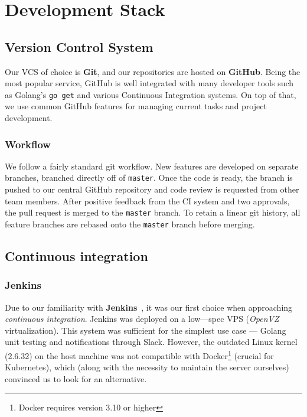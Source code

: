 \chapter{Development Stack}
\section{Version Control System}
Our VCS of choice is \textbf{Git}, and our repositories are hosted on \textbf{GitHub}. Being the most popular service,
GitHub is well integrated with many developer tools such as Golang’s \texttt{go get} and various Continuous Integration systems.
On top of that, we use common GitHub features for managing current tasks and project development.
\subsection{Workflow}
We follow a fairly standard git workflow. New features are developed on separate branches, branched directly off of \texttt{master}.
Once the code is ready, the branch is pushed to our central GitHub repository and code review is requested from other team members.
After positive feedback from the CI system and two approvals, the pull request is merged to the \texttt{master} branch.
To retain a linear git history, all feature branches are rebased onto the \texttt{master} branch before merging.
\section{Continuous integration}
\subsection{Jenkins}
Due to our familiarity with \textbf{Jenkins}~\cite{jenkins}, it was our first choice when approaching \textit{continuous integration}. Jenkins was
deployed on a low---spec VPS (\textit{OpenVZ} virtualization). This system was sufficient for the simplest use case --- Golang unit
testing and notifications through Slack. However, the outdated Linux kernel (2.6.32) on the host machine was not compatible with 
Docker\footnote{Docker requires version 3.10 or higher} (crucial for Kubernetes), which (along with the necessity to maintain the server ourselves)
convinced us to look for an alternative.
